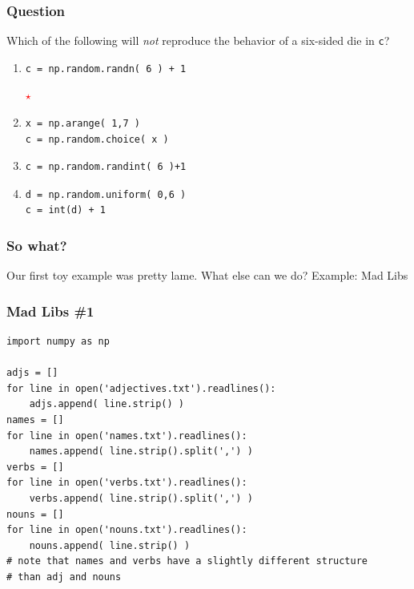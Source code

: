 \documentclass[11pt]{beamer}
\newcommand{\correctstar}{\textcolor{red}{$\star$}}
\begin{document}
\begin{frame}[fragile]
  \frametitle{Question}
  \Enlarge

  Which of the following will \emph{not} reproduce the behavior of a six-sided die in \texttt{c}?

  \begin{enumerate}[label=\Alph*]
  \item
  \begin{Verbatim}
c = np.random.randn( 6 ) + 1
  \end{Verbatim}
  \correctstar
  \item
  \begin{Verbatim}
x = np.arange( 1,7 )
c = np.random.choice( x )
  \end{Verbatim}
  \item
  \begin{Verbatim}
c = np.random.randint( 6 )+1
  \end{Verbatim}
  \item
  \begin{Verbatim}
d = np.random.uniform( 0,6 )
c = int(d) + 1
  \end{Verbatim}
  \end{enumerate}
\end{frame}

\begin{frame}[fragile]
  \frametitle{So what?}
  \Enlarge

  \begin{enumerate}
  \myitem  Our first toy example was pretty lame.  What else can we do? %
  \myitem    Example:  Mad Libs
  \end{enumerate}
\end{frame}

\begin{frame}[fragile]
  \frametitle{Mad Libs \#1}

  \begin{Verbatim}
import numpy as np

adjs = []
for line in open('adjectives.txt').readlines():
    adjs.append( line.strip() )
names = []
for line in open('names.txt').readlines():
    names.append( line.strip().split(',') )
verbs = []
for line in open('verbs.txt').readlines():
    verbs.append( line.strip().split(',') )
nouns = []
for line in open('nouns.txt').readlines():
    nouns.append( line.strip() )
# note that names and verbs have a slightly different structure
# than adj and nouns
  \end{Verbatim}
\end{frame}
\end{document}
